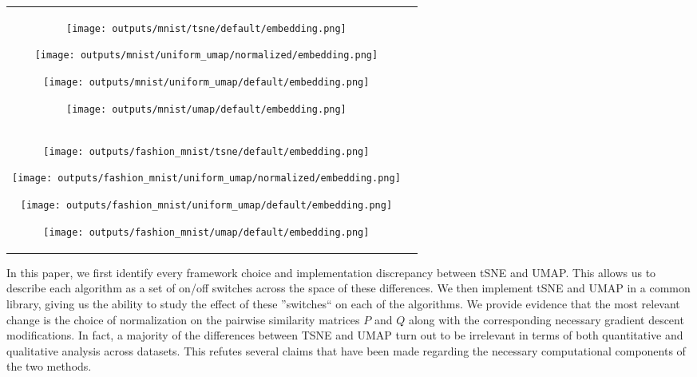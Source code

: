 \documentclass[sigconf, nonacm]{acmart}
\newcommand\ourmethod{Uniform UMAP }
\begin{document}
\begin{figure*}[h]
    \begin{tabular}{cc}
        \texttt{[image: outputs/mnist/tsne/default/embedding.png]}\par
        \texttt{[image: outputs/mnist/uniform\_umap/normalized/embedding.png]}\par
        \texttt{[image: outputs/mnist/uniform\_umap/default/embedding.png]}\par
        \texttt{[image: outputs/mnist/umap/default/embedding.png]}\\
        \texttt{[image: outputs/fashion\_mnist/tsne/default/embedding.png]}\par
        \texttt{[image: outputs/fashion\_mnist/uniform\_umap/normalized/embedding.png]}\par
        \texttt{[image: outputs/fashion\_mnist/uniform\_umap/default/embedding.png]}\par
        \texttt{[image: outputs/fashion\_mnist/umap/default/embedding.png]}
    \end{tabular}
\caption{Uniform UMAP is able to recreate both TSNE and UMAP embeddings by just changing two hyperparameters. Images above are on the MNIST and Fashion MNIST
datasets. From left to right: TSNE, \ourmethod with normalization, \ourmethod and UMAP}
\end{figure*}

In this paper, we first identify every framework choice and implementation discrepancy between tSNE and UMAP. This allows us to describe each algorithm as a set of on/off
switches across the space of these differences. We then implement tSNE and UMAP in a common library, giving us the ability to study the effect of these
''switches`` on each of the algorithms.
We provide evidence that the most relevant change is the choice of normalization on the pairwise similarity matrices $P$ and $Q$ along with the corresponding
necessary gradient descent modifications.
In fact, a majority of the differences between TSNE and UMAP turn out to be irrelevant in terms of both quantitative and qualitative analysis across datasets.
This refutes several claims that have been made regarding the necessary computational components of the two methods.
\end{document}
